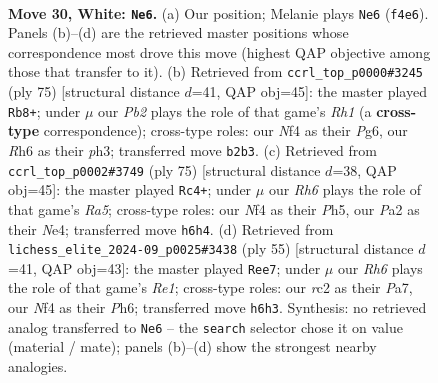 \documentclass[11pt]{article}
\begin{document}
\clearpage

\begin{figure}[p]\centering
\begin{subfigure}{0.46\textwidth}\centering
\resizebox{\linewidth}{!}{%
\newchessgame
\chessboard[
  setfen={8/ppp5/7R/1k3p2/4pN2/8/PPr2r1P/1R2K3 w - - 4 30},
  showmover=false,
  pgfstyle=straightmove, color=movearrow, markmove={f4-e6}
]}
\caption{}
\end{subfigure}\hfill
\begin{subfigure}{0.46\textwidth}\centering
\resizebox{\linewidth}{!}{%
\newchessgame
\chessboard[
  setfen={7r/2r3k1/3p1Rp1/3P3p/4P3/1K5P/1P4P1/5R2 b - - 0 38},
  showmover=false,
  pgfstyle=straightmove, color=movearrow, markmove={h8-b8}
]}
\caption{}
\end{subfigure}
\\[4pt]
\begin{subfigure}{0.46\textwidth}\centering
\resizebox{\linewidth}{!}{%
\newchessgame
\chessboard[
  setfen={8/8/2p1r1k1/4pR1p/r3n3/P6P/1PK3P1/4BR2 b - - 1 38},
  showmover=false,
  pgfstyle=straightmove, color=movearrow, markmove={a4-c4}
]}
\caption{}
\end{subfigure}\hfill
\begin{subfigure}{0.46\textwidth}\centering
\resizebox{\linewidth}{!}{%
\newchessgame
\chessboard[
  setfen={4r3/p1p2r1k/2p1p1Rp/4P2P/1P6/8/P1P5/2K3R1 b - - 0 28},
  showmover=false,
  pgfstyle=straightmove, color=movearrow, markmove={e8-e7}
]}
\caption{}
\end{subfigure}
\caption{\textbf{Move 30, White: \texttt{Ne6}.} (a) Our position; Melanie plays \texttt{Ne6} (\texttt{f4e6}). Panels (b)--(d) are the retrieved master positions whose correspondence most drove this move (highest QAP objective among those that transfer to it). (b) Retrieved from \texttt{ccrl\_top\_p0000\#3245} (ply 75) [structural distance $d$=41, QAP obj=45]: the master played \texttt{Rb8+}; under $\mu$ our \emph{Pb2} plays the role of that game's \emph{Rh1} (a \textbf{cross-type} correspondence); cross-type roles: our \emph{N}f4 as their \emph{P}g6, our \emph{R}h6 as their \emph{p}h3; transferred move \texttt{b2b3}. (c) Retrieved from \texttt{ccrl\_top\_p0002\#3749} (ply 75) [structural distance $d$=38, QAP obj=45]: the master played \texttt{Rc4+}; under $\mu$ our \emph{Rh6} plays the role of that game's \emph{Ra5}; cross-type roles: our \emph{N}f4 as their \emph{P}h5, our \emph{P}a2 as their \emph{N}e4; transferred move \texttt{h6h4}. (d) Retrieved from \texttt{lichess\_elite\_2024-09\_p0025\#3438} (ply 55) [structural distance $d$=41, QAP obj=43]: the master played \texttt{Ree7}; under $\mu$ our \emph{Rh6} plays the role of that game's \emph{Re1}; cross-type roles: our \emph{r}c2 as their \emph{P}a7, our \emph{N}f4 as their \emph{P}h6; transferred move \texttt{h6h3}. Synthesis: no retrieved analog transferred to \texttt{Ne6} -- the \texttt{search} selector chose it on value (material / mate); panels (b)--(d) show the strongest nearby analogies.}
\label{fig:thought-m58}
\end{figure}
\end{document}

